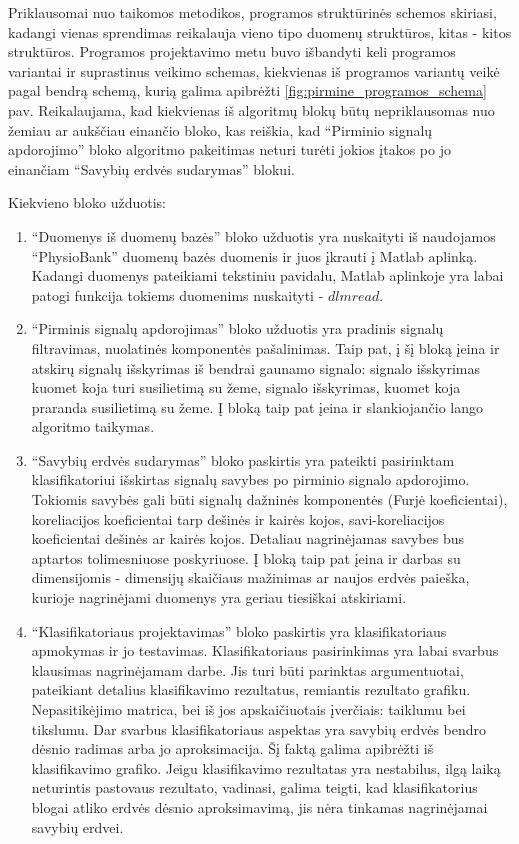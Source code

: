 \documentclass[]{vgtuef}
\begin{document}
Priklausomai nuo taikomos metodikos, programos struktūrinės schemos
skiriasi, kadangi vienas sprendimas reikalauja vieno tipo duomenų
struktūros, kitas - kitos struktūros. Programos projektavimo metu buvo
išbandyti keli programos variantai ir suprastinus veikimo schemas,
kiekvienas iš programos variantų veikė pagal bendrą schemą, kurią
galima apibrėžti \ref{fig:pirmine_programos_schema} pav. Reikalaujama,
kad kiekvienas iš algoritmų blokų būtų nepriklausomas nuo žemiau ar
aukščiau einančio bloko, kas reiškia, kad ``Pirminio signalų
apdorojimo'' bloko algoritmo pakeitimas neturi turėti jokios įtakos po
jo einančiam ``Savybių erdvės sudarymas'' blokui. 

Kiekvieno bloko užduotis:

\begin{enumerate}
\item ``Duomenys iš duomenų bazės'' bloko užduotis yra nuskaityti iš
  naudojamos ``PhysioBank'' duomenų bazės duomenis ir juos įkrauti į
  Matlab aplinką. Kadangi duomenys pateikiami tekstiniu pavidalu,
  Matlab aplinkoje yra labai patogi funkcija tokiems duomenims
  nuskaityti - $dlmread$.
\item ``Pirminis signalų apdorojimas'' bloko užduotis yra pradinis
  signalų filtravimas, nuolatinės komponentės pašalinimas. Taip pat, į
  šį bloką įeina ir atskirų signalų išskyrimas iš bendrai gaunamo
  signalo: signalo išskyrimas kuomet koja turi susilietimą su žeme,
  signalo išskyrimas, kuomet koja praranda susilietimą su žeme. Į
  bloką taip pat įeina ir slankiojančio lango algoritmo taikymas.
\item ``Savybių erdvės sudarymas'' bloko paskirtis yra pateikti
  pasirinktam klasifikatoriui išskirtas signalų savybes po pirminio
  signalo apdorojimo. Tokiomis savybės gali būti signalų dažninės
  komponentės (Furjė koeficientai), koreliacijos koeficientai tarp
  dešinės ir kairės kojos, savi-koreliacijos koeficientai dešinės ar
  kairės kojos. Detaliau nagrinėjamas savybes bus aptartos
  tolimesniuose poskyriuose. Į bloką taip pat įeina ir darbas su
  dimensijomis - dimensijų skaičiaus mažinimas ar naujos erdvės
  paieška, kurioje nagrinėjami duomenys yra geriau tiesiškai
  atskiriami.
\item ``Klasifikatoriaus projektavimas'' bloko paskirtis yra
  klasifikatoriaus apmokymas ir jo testavimas. Klasifikatoriaus
  pasirinkimas yra labai svarbus klausimas nagrinėjamam darbe. Jis
  turi būti parinktas argumentuotai, pateikiant detalius klasifikavimo
  rezultatus, remiantis rezultato grafiku. Nepasitikėjimo matrica, bei
  iš jos apskaičiuotais įverčiais: taiklumu bei tikslumu. Dar svarbus
  klasifikatoriaus aspektas yra savybių erdvės bendro dėsnio radimas
  arba jo aproksimacija. Šį faktą galima apibrėžti iš klasifikavimo
  grafiko. Jeigu klasifikavimo rezultatas yra nestabilus, ilgą laiką
  neturintis pastovaus rezultato, vadinasi, galima teigti, kad
  klasifikatorius blogai atliko erdvės dėsnio aproksimavimą, jis nėra
  tinkamas nagrinėjamai savybių erdvei.
\end{enumerate}
\end{document}
